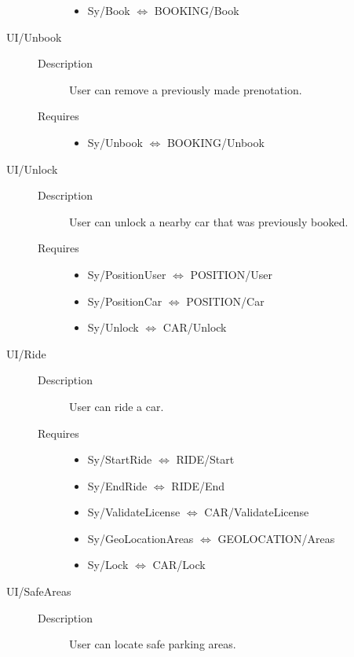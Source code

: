 \documentclass[11pt]{article} %
\begin{document}
\begin{description}
\begin{description}
\begin{itemize}
			\item Sy/Book $\Leftrightarrow$ BOOKING/Book
		\end{itemize}
	\end{description}
	\item[UI/Unbook] \hfill
	\begin{description}
		\item[Description] User can remove a previously made prenotation.
		\item[Requires] \hfill
		\begin{itemize}
			\item Sy/Unbook $\Leftrightarrow$ BOOKING/Unbook
		\end{itemize}
	\end{description}
	\item[UI/Unlock] \hfill
	\begin{description}
		\item[Description] User can unlock a nearby car that was previously booked.
		\item[Requires] \hfill
		\begin{itemize}
			\item Sy/PositionUser $\Leftrightarrow$ POSITION/User
			\item Sy/PositionCar $\Leftrightarrow$ POSITION/Car
			\item Sy/Unlock $\Leftrightarrow$ CAR/Unlock
		\end{itemize}
	\end{description}
	\item[UI/Ride] \hfill
	\begin{description}
		\item[Description] User can ride a car.
		\item[Requires] \hfill
		\begin{itemize}
			\item Sy/StartRide $\Leftrightarrow$ RIDE/Start
			\item Sy/EndRide $\Leftrightarrow$ RIDE/End
			\item Sy/ValidateLicense $\Leftrightarrow$ CAR/ValidateLicense
			\item Sy/GeoLocationAreas $\Leftrightarrow$ GEOLOCATION/Areas
			\item Sy/Lock $\Leftrightarrow$ CAR/Lock
		\end{itemize}
	\end{description}
	\item[UI/SafeAreas] \hfill
	\begin{description}
		\item[Description] User can locate safe parking areas.

\end{description}
\end{description}
\end{document}
